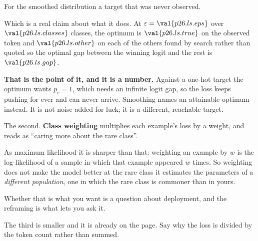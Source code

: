 \begin{fr}
\begin{ansblock}
For the smoothed distribution \dash{} a target that was never observed.
\end{ansblock}

Which is a real claim about what it does. At
$\varepsilon = \val{p26.ls.eps}$ over $\val{p26.ls.classes}$ classes, the
optimum is $\val{p26.ls.true}$ on the observed token and
$\val{p26.ls.other}$ on each of the others \dash{} found by search rather
than quoted \dash{} so the optimal gap between the winning logit and the rest
is $\val{p26.ls.gap}$.

\textbf{That is the point of it, and it is a number.} Against a one-hot
target the optimum wants $p_c = 1$, which needs an infinite logit gap, so the
loss keeps pushing for ever and can never arrive. Smoothing names an
attainable optimum instead. It is not noise added for luck; it is a
different, reachable target.
\end{fr}

\begin{fr}
The second. \textbf{Class weighting} multiplies each example's loss by a
weight, and reads as \enquote{caring more about the rare class}.

As maximum likelihood it is sharper than that: weighting an example by $w$ is
the log-likelihood of a sample in which that example appeared $w$ times. So
weighting does not make the model better at the rare class \dash{} it
estimates the parameters of a \emph{different population}, one in which the
rare class is commoner than in yours.

Whether that is what you want is a question about deployment, and the
reframing is what lets you ask it.

The third is smaller and it is already on the page. Say why the loss is
divided by the token count rather than summed.
\dotline
\nextframe
\end{fr}

